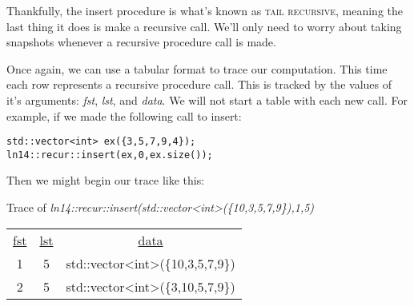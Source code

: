 \documentclass[nobib]{tufte-handout}
\begin{document}
Thankfully, the insert procedure is what's known as \textsc{tail recursive}, meaning the last thing it does is make a recursive call. We'll only need to worry about taking snapshots whenever a recursive procedure call is made.

Once again, we can use a tabular format to trace our computation. This time each row represents a recursive procedure call. This is tracked by the values of it's arguments: \textit{fst}, \textit{lst}, and \textit{data}. We will not start a table with each new call. For example, if we made the following call to insert:

\begin{lstlisting}
std::vector<int> ex({3,5,7,9,4});
ln14::recur::insert(ex,0,ex.size());
\end{lstlisting}

Then we might begin our trace like this:

\begin{framed}
Trace of \textit{ln14::recur::insert(std::vector<int>(\{10,3,5,7,9\}),1,5)}
\begin{center}
\begin{tabular}{ccc}
  \underline{fst} & \underline{lst} & \underline{data} \\
  1 & 5 & std::vector<int>(\{10,3,5,7,9\}) \\
  2 & 5 & std::vector<int>(\{3,10,5,7,9\})
\end{tabular}
\end{center}
\end{framed}
\end{document}
